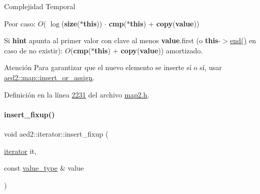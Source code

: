 \begin{DoxyDescription}
\item[Complejidad Temporal]
\begin{DoxyItemize}
\item Peor caso\+: $O$( $\log$({\bfseries size}({\bfseries $\ast$this})) $\cdot$ {\bfseries cmp}({\bfseries $\ast$this}) $+$ {\bfseries copy}({\bfseries value}))
\item Si {\bfseries hint} apunta al primer valor con clave al menos {\bfseries value}.first (o {\bfseries this}-\/$>$\hyperlink{classaed2_1_1iterator_a67caf9468be999e9be96b7add5d79946_a67caf9468be999e9be96b7add5d79946}{end()} en caso de no existir)\+: $O$({\bfseries cmp}({\bfseries $\ast$this}) $+$ {\bfseries copy}({\bfseries value})) amortizado. 
\end{DoxyItemize}
\end{DoxyDescription}

\begin{DoxyAttention}{Atención}
Para garantizar que el nuevo elemento se inserte sí o sí, usar \hyperlink{classaed2_1_1map_a2ef6723c183916276b0afc4a4c721475_a2ef6723c183916276b0afc4a4c721475}{aed2\+::map\+::insert\+\_\+or\+\_\+assign}. 
\end{DoxyAttention}


Definición en la línea \hyperlink{map2_8h_source_l02231}{2231} del archivo \hyperlink{map2_8h_source}{map2.\+h}.

\mbox{\label{classaed2_1_1iterator_ab23378eb6149357e1a2167e9804eb6e3_ab23378eb6149357e1a2167e9804eb6e3}} 
\paragraph{\texorpdfstring{insert\+\_\+fixup()}{insert\_fixup()}}
{\footnotesize\ttfamily void aed2\+::iterator\+::insert\+\_\+fixup (\begin{DoxyParamCaption}\item[{\hyperlink{classaed2_1_1iterator_1_1iterator}{iterator}}]{it,  }\item[{const \hyperlink{classaed2_1_1iterator_a6411a2c08b2b7c52f063bef1a168acb6_a6411a2c08b2b7c52f063bef1a168acb6}{value\+\_\+type} \&}]{value }\end{DoxyParamCaption})\hspace{0.3cm}{\ttfamily [inline]}}



